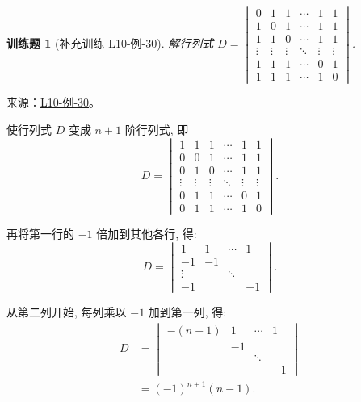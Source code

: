 \documentclass[UTF8,12pt,a4paper,fontset=fandol]{ctexart}
\newtheorem{exercise}{训练题}[section]
\begin{document}
\begin{exercise}[补充训练 L10-例-30]\label{prob:L10-例-30}
解行列式 $D=\begin{vmatrix}
            0      & 1      & 1      & \cdots & 1      & 1      \\
            1      & 0      & 1      & \cdots & 1      & 1      \\
            1      & 1      & 0      & \cdots & 1      & 1      \\
            \vdots & \vdots & \vdots & \ddots & \vdots & \vdots \\
            1      & 1      & 1      & \cdots & 0      & 1      \\
            1      & 1      & 1      & \cdots & 1      & 0
        \end{vmatrix}$.
\end{exercise}
\noindent 来源：\href{https://github.com/yhwu-is/Linear-Algebra-Left-Undone/blob/new/%E8%AE%B2%E4%B9%89/%E4%B8%93%E9%A2%98/10%20%E8%A1%8C%E5%88%97%E5%BC%8F.tex}{L10-例-30}。
\begin{solve}
使行列式 $D$ 变成 $n+1$ 阶行列式, 即
    \[ D=\begin{vmatrix}
            1      & 1      & 1      & \cdots & 1      & 1      \\
            0      & 0      & 1      & \cdots & 1      & 1      \\
            0      & 1      & 0      & \cdots & 1      & 1      \\
            \vdots & \vdots & \vdots & \ddots & \vdots & \vdots \\
            0      & 1      & 1      & \cdots & 0      & 1      \\
            0      & 1      & 1      & \cdots & 1      & 0
        \end{vmatrix}. \]

    再将第一行的 $-1$ 倍加到其他各行, 得:
    \[ D =\begin{vmatrix}
            1      & 1  & \cdots & 1  \\
            -1     & -1 &        &    \\
            \vdots &    & \ddots &    \\
            -1     &    &        & -1
        \end{vmatrix}. \]

    从第二列开始, 每列乘以 $-1$ 加到第一列, 得:
    \begin{align*}
        D & =\begin{vmatrix}
                 -(n-1) & 1  & \cdots & 1  \\
                        & -1 &        &    \\
                        &    & \ddots &    \\
                        &    &        & -1
             \end{vmatrix} \\
          & =(-1)^{n+1}(n-1).
    \end{align*}
\end{solve}
\end{document}
